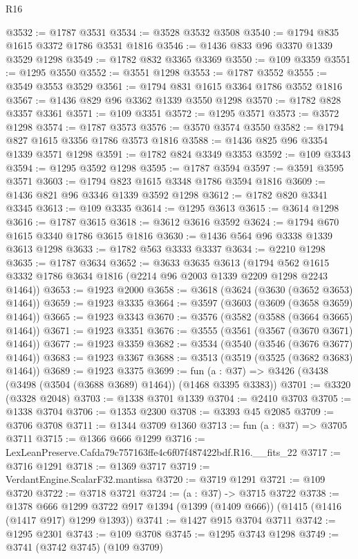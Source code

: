 \begin{lexlean}{R16}
\begin{coremodule}
@3532 := @1787 @3531
@3534 := @3528 @3532 @3508
@3540 := @1794 @835 @1615 @3372 @1786 @3531 @1816
@3546 := @1436 @833 @96 @3370 @1339 @3529 @1298
@3549 := @1782 @832 @3365 @3369
@3550 := @109 @3359
@3551 := @1295 @3550
@3552 := @3551 @1298
@3553 := @1787 @3552
@3555 := @3549 @3553 @3529
@3561 := @1794 @831 @1615 @3364 @1786 @3552 @1816
@3567 := @1436 @829 @96 @3362 @1339 @3550 @1298
@3570 := @1782 @828 @3357 @3361
@3571 := @109 @3351
@3572 := @1295 @3571
@3573 := @3572 @1298
@3574 := @1787 @3573
@3576 := @3570 @3574 @3550
@3582 := @1794 @827 @1615 @3356 @1786 @3573 @1816
@3588 := @1436 @825 @96 @3354 @1339 @3571 @1298
@3591 := @1782 @824 @3349 @3353
@3592 := @109 @3343
@3594 := @1295 @3592 @1298
@3595 := @1787 @3594
@3597 := @3591 @3595 @3571
@3603 := @1794 @823 @1615 @3348 @1786 @3594 @1816
@3609 := @1436 @821 @96 @3346 @1339 @3592 @1298
@3612 := @1782 @820 @3341 @3345
@3613 := @109 @3335
@3614 := @1295 @3613
@3615 := @3614 @1298
@3616 := @1787 @3615
@3618 := @3612 @3616 @3592
@3624 := @1794 @670 @1615 @3340 @1786 @3615 @1816
@3630 := @1436 @564 @96 @3338 @1339 @3613 @1298
@3633 := @1782 @563 @3333 @3337
@3634 := @2210 @1298
@3635 := @1787 @3634
@3652 := @3633
    @3635
    @3613
    (@1794 @562 @1615 @3332 @1786 @3634 @1816 (@2214 @96 @2003 @1339 @2209 @1298 @2243 @1464))
@3653 := @1923 @2000
@3658 := @3618 (@3624 (@3630 (@3652 @3653) @1464))
@3659 := @1923 @3335
@3664 := @3597 (@3603 (@3609 (@3658 @3659) @1464))
@3665 := @1923 @3343
@3670 := @3576 (@3582 (@3588 (@3664 @3665) @1464))
@3671 := @1923 @3351
@3676 := @3555 (@3561 (@3567 (@3670 @3671) @1464))
@3677 := @1923 @3359
@3682 := @3534 (@3540 (@3546 (@3676 @3677) @1464))
@3683 := @1923 @3367
@3688 := @3513 (@3519 (@3525 (@3682 @3683) @1464))
@3689 := @1923 @3375
@3699 := fun (a : @37) => @3426 (@3438 (@3498 (@3504 (@3688 @3689) @1464)) (@1468 @3395 @3383))
@3701 := @3320 (@3328 @2048)
@3703 := @1338 @3701 @1339
@3704 := @2410 @3703
@3705 := @1338 @3704
@3706 := @1353 @2300
@3708 := @3393 @45 @2085
@3709 := @3706 @3708
@3711 := @1344 @3709 @1360
@3713 := fun (a : @37) => @3705 @3711
@3715 := @1366 @666 @1299
@3716 := LexLeanPreserve.Cafda79c757163ffe4c6f07f487422bdf.R16.__fits_22
@3717 := @3716 @1291
@3718 := @1369 @3717
@3719 := VerdantEngine.ScalarF32.mantissa
@3720 := @3719 @1291
@3721 := @109 @3720
@3722 := @3718 @3721
@3724 := (a : @37) -> @3715 @3722
@3738 := @1378
    @666
    @1299
    @3722
    @917
    @1394
    (@1399 (@1409 @666))
    (@1415 (@1416 (@1417 @917) @1299 @1393))
@3741 := @1427 @915 @3704 @3711
@3742 := @1295 @2301
@3743 := @109 @3708
@3745 := @1295 @3743 @1298
@3749 := @3741 (@3742 @3745) (@109 @3709)

\end{coremodule}
\end{lexlean}
